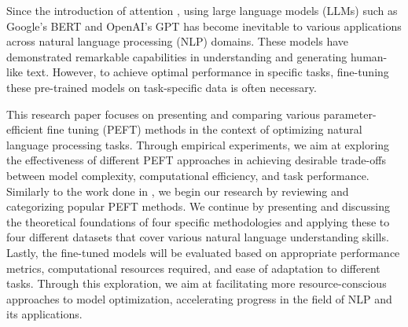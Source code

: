Since the introduction of attention \cite{vaswani2017attention}, using large language models (LLMs) such as Google's BERT \cite{devlin2019bert} and OpenAI's GPT \cite{radford2018gpt} has become inevitable to various applications across natural language processing (NLP) domains. These models have demonstrated remarkable capabilities in understanding and generating human-like text. However, to achieve optimal performance in specific tasks, fine-tuning these pre-trained models on task-specific data is often necessary.

This research paper focuses on presenting and comparing various parameter-efficient fine tuning (PEFT) methods in the context of optimizing natural language processing tasks. Through empirical experiments, we aim at exploring the effectiveness of different PEFT approaches in achieving desirable trade-offs between model complexity, computational efficiency, and task performance. Similarly to the work done in \cite{xu2023parameterefficient}, we begin our research by reviewing and categorizing popular PEFT methods. We continue by presenting and discussing the theoretical foundations of four specific methodologies and applying these to four different datasets that cover various natural language understanding skills. Lastly, the fine-tuned models will be evaluated based on appropriate performance metrics, computational resources required, and ease of adaptation to different tasks. Through this exploration, we aim at facilitating more resource-conscious approaches to model optimization, accelerating progress in the field of NLP and its applications.